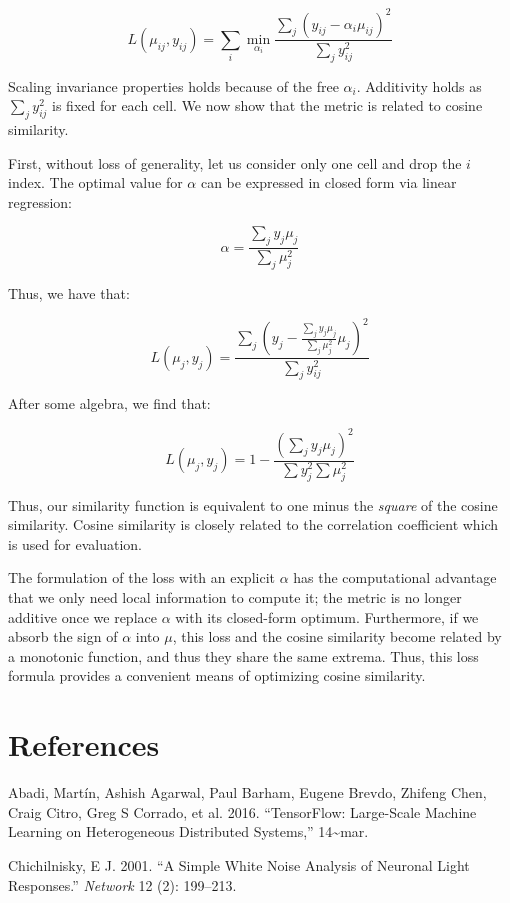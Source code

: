\documentclass[]{article}
\begin{document}
\[
L(\mu_{ij}, y_{ij}) = \sum_i \min_{\alpha_i} \frac{\sum_j (y_{ij} - \alpha_i \mu_{ij})^2}{\sum_{j} y_{ij}^2}
\]

Scaling invariance properties holds because of the free \(\alpha_i\).
Additivity holds as \(\sum_{j} y_{ij}^2\) is fixed for each cell. We now
show that the metric is related to cosine similarity.

First, without loss of generality, let us consider only one cell and
drop the \(i\) index. The optimal value for \(\alpha\) can be expressed
in closed form via linear regression:

\[\alpha = \frac{\sum_j y_j \mu_j}{\sum_j \mu_j^2}\]

Thus, we have that:

\[
L(\mu_{j}, y_{j}) = \frac{\sum_j (y_{j} - \frac{\sum_j y_j \mu_j}{\sum_j \mu_j^2} \mu_{j})^2}{\sum_{j} y_{ij}^2}
\]

After some algebra, we find that:

\[
L(\mu_{j}, y_{j}) = 1 - \frac{(\sum_j y_j \mu_j)^2}{\sum y_j^2 \sum \mu_j^2}
\]

Thus, our similarity function is equivalent to one minus the
\emph{square} of the cosine similarity. Cosine similarity is closely
related to the correlation coefficient which is used for evaluation.

The formulation of the loss with an explicit \(\alpha\) has the
computational advantage that we only need local information to compute
it; the metric is no longer additive once we replace \(\alpha\) with its
closed-form optimum. Furthermore, if we absorb the sign of \(\alpha\)
into \(\mu\), this loss and the cosine similarity become related by a
monotonic function, and thus they share the same extrema. Thus, this
loss formula provides a convenient means of optimizing cosine
similarity.

\section*{References}\label{references}

\hypertarget{refs}{}
\hypertarget{ref-Abadi2016-me}{}
Abadi, Martín, Ashish Agarwal, Paul Barham, Eugene Brevdo, Zhifeng Chen,
Craig Citro, Greg S Corrado, et al. 2016. ``TensorFlow: Large-Scale
Machine Learning on Heterogeneous Distributed Systems,''
14\textasciitilde{}mar.

\hypertarget{ref-Chichilnisky2001-wd}{}
Chichilnisky, E J. 2001. ``A Simple White Noise Analysis of Neuronal
Light Responses.'' \emph{Network} 12 (2): 199--213.
\end{document}

